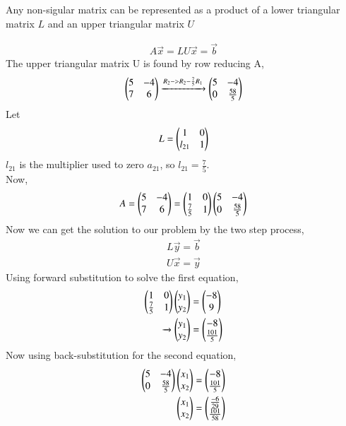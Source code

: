\documentclass[journal]{IEEEtran}
\begin{document}
Any non-sigular matrix can be represented as a product of a lower triangular matrix $L$ and an
upper triangular matrix $U$

\begin{align}
    A\vec{x} = LU\vec{x} = \vec{b}
\end{align}
The upper triangular matrix U is found by row reducing A,
\begin{align}
    \begin{pmatrix}5 & -4 \\ 7 & 6 \end{pmatrix} \xrightarrow{R_2 -> R_2 - \frac{7}{5}R_1} \begin{pmatrix}5 & -4 \\ 0 & \frac{58}{5}\end{pmatrix}  
\end{align}
Let 
\begin{align}
    L = \begin{pmatrix}1 & 0\\ l_{21} & 1\end{pmatrix}
\end{align}
$l_{21}$ is the multiplier used to zero $a_{21}$, so $l_{21} = \frac{7}{5}$.\\
\newline
Now,
\begin{align}
    A = \begin{pmatrix}5 & -4 \\ 7 & 6\end{pmatrix} = \begin{pmatrix}1 & 0 \\ \frac{7}{5} & 1\end{pmatrix}\begin{pmatrix}5 & -4 \\ 0 & \frac{58}{5}\end{pmatrix}
\end{align}
Now we can get the solution to our problem by the two step process,
\begin{align}
    L\vec{y} = \vec{b}\\
    U\vec{x} = \vec{y}
\end{align}
Using forward substitution to solve the first equation,
\begin{align}
    \begin{pmatrix}1 & 0 \\ \frac{7}{5} & 1\end{pmatrix}\begin{pmatrix}y_1 \\ y_2\end{pmatrix} &= \begin{pmatrix}-8 \\ 9\end{pmatrix}\\
    \xrightarrow{} \begin{pmatrix}y_1 \\ y_2\end{pmatrix} &= \begin{pmatrix}-8 \\ \frac{101}{5}\end{pmatrix} 
\end{align}
Now using back-substitution for the second equation,
\begin{align}
    \begin{pmatrix}5 & -4 \\ 0 & \frac{58}{5}\end{pmatrix}\begin{pmatrix}x_1 \\ x_2\end{pmatrix} &= \begin{pmatrix}-8 \\ \frac{101}{5}\end{pmatrix}\\
    \begin{pmatrix}x_1 \\ x_2\end{pmatrix} &= \begin{pmatrix}\frac{-6}{29} \\ \frac{101}{58}\end{pmatrix}
\end{align}
\end{document}
